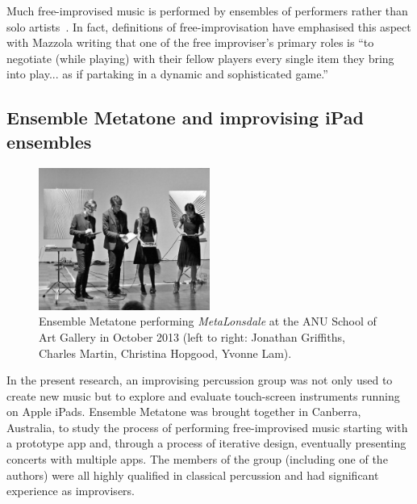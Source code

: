 \documentclass[graybox]{svmult}
\begin{document}
Much free-improvised music is performed by ensembles of performers
rather than solo artists~\cite{Stenstrom:2009xy}. In fact, definitions
of free-improvisation have emphasised this aspect with Mazzola writing
that one of the free improviser's primary roles is ``to negotiate
(while playing) with their fellow players every single item they bring
into play... as if partaking in a dynamic and sophisticated
game.''~\cite{Mazzola:2009cr} 

\subsection{Ensemble Metatone and improvising iPad ensembles}


\begin{figure}
  \centering
  \includegraphics[width=0.5\textwidth]{figures/ensemblemetatone-bw}
  \caption{Ensemble Metatone performing \emph{MetaLonsdale} at the ANU
    School of Art Gallery in October 2013 (left to right: Jonathan
    Griffiths, Charles Martin, Christina Hopgood, Yvonne Lam).}
  \label{ensemblemetatoneperforming}
\end{figure}



In the present research, an improvising percussion group was not only
used to create new music but to explore and evaluate touch-screen
instruments running on Apple iPads. Ensemble Metatone was brought
together in Canberra, Australia, to study the process of performing
free-improvised music starting with a prototype app and, through a
process of iterative design, eventually presenting concerts with
multiple apps. The members of the group (including one of the authors)
were all highly qualified in classical percussion and had significant
experience as improvisers.
\end{document}
